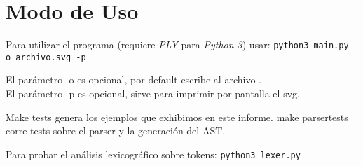 \section{Modo de Uso}

Para utilizar el programa (requiere \emph{PLY} para \emph{Python 3}) usar: \newline
\texttt{python3 main.py  -o archivo.svg -p}

El parámetro -o es opcional, por default escribe al archivo . \\
El parámetro -p es opcional, sirve para imprimir por pantalla el svg.

Make tests genera los ejemplos que exhibimos en este informe. \newline
make parsertests corre tests sobre el parser y la generación del AST.

Para probar el análisis lexicográfico sobre tokens: \newline
\texttt{python3 lexer.py  }
